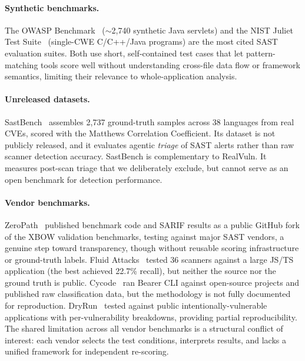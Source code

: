 \paragraph{Synthetic benchmarks.}
The OWASP Benchmark~\cite{owaspbenchmark} (${\sim}$2{,}740 synthetic Java servlets) and the NIST Juliet Test Suite~\cite{boland2012juliet} (single-CWE C/C++/Java programs) are the most cited SAST evaluation suites. Both use short, self-contained test cases that let pattern-matching tools score well without understanding cross-file data flow or framework semantics, limiting their relevance to whole-application analysis.

\paragraph{Unreleased datasets.}
SastBench~\cite{feiglin2026sastbench} assembles 2{,}737 ground-truth samples across 38 languages from real CVEs, scored with the Matthews Correlation Coefficient. Its dataset is not publicly released, and it evaluates agentic \emph{triage} of SAST alerts rather than raw scanner detection accuracy. SastBench is complementary to RealVuln. It measures post-scan triage that we deliberately exclude, but cannot serve as an open benchmark for detection performance.

\paragraph{Vendor benchmarks.}
ZeroPath~\cite{zeropath2024} published benchmark code and SARIF results as a public GitHub fork of the XBOW validation benchmarks, testing against major SAST vendors, a genuine step toward transparency, though without reusable scoring infrastructure or ground-truth labels. Fluid Attacks~\cite{fluidattacks2025} tested 36 scanners against a large JS/TS application (the best achieved 22.7\% recall), but neither the source nor the ground truth is public. Cycode~\cite{cycode2024benchmark} ran Bearer CLI against open-source projects and published raw classification data, but the methodology is not fully documented for reproduction. DryRun~\cite{dryrun2025sast} tested against public intentionally-vulnerable applications with per-vulnerability breakdowns, providing partial reproducibility. The shared limitation across all vendor benchmarks is a structural conflict of interest: each vendor selects the test conditions, interprets results, and lacks a unified framework for independent re-scoring.

